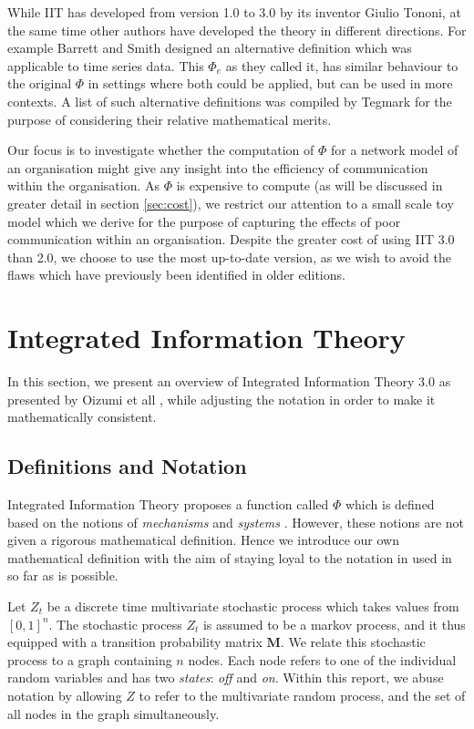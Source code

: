 While IIT has developed from version 1.0 to 3.0 by its inventor Giulio Tononi, at the same time other authors have developed the theory in different directions. For example Barrett and Smith \cite{barrett2011practical} designed an alternative definition which was applicable to time series data. This $\Phi_e$ as they called it, has similar behaviour to the original $\Phi$ in settings where both could be applied, but can be used in more contexts. A list of such alternative definitions was compiled by Tegmark \cite{tegmark2016improved} for the purpose of considering their relative mathematical merits.

Our focus is to investigate whether the computation of $\Phi$ for a network model of an organisation might give any insight into the efficiency of communication within the organisation. As $\Phi$ is expensive to compute (as will be discussed in greater detail in section \ref{sec:cost}), we restrict our attention to a small scale toy model which we derive for the purpose of capturing the effects of poor communication within an organisation. Despite the greater cost of using IIT 3.0 than 2.0, we choose to use the most up-to-date version, as we wish to avoid the flaws which have previously been identified in older editions.


\section{Integrated Information Theory}
\label{sec:iit}

In this section, we present an overview of Integrated Information Theory 3.0 as presented by Oizumi et all \cite{oizumi2014phenomenology}, while adjusting the notation in order to make it mathematically consistent.
	
\subsection{Definitions and Notation}

Integrated Information Theory proposes a function called $\Phi$ which is defined based on the notions of \textit{mechanisms} and \textit{systems} \cite{oizumi2014phenomenology}. However, these notions are not given a rigorous mathematical definition. Hence we introduce our own mathematical definition with the aim of staying loyal to the notation in used in \cite{krohn2016computing} so far as is possible.

Let $Z_t$ be a discrete time multivariate stochastic process which takes values from $[0,1]^n$.  The stochastic process $Z_t$ is assumed to be a markov process, and it thus equipped with a transition probability matrix $\mathbf{M}$. We relate this stochastic process to a graph containing $n$ nodes. Each node refers to one of the individual random variables and has two \textit{states}: \textit{off}  and \textit{on}. Within this report, we abuse notation by allowing $Z$ to refer to the multivariate random process, and the set of all nodes in the graph simultaneously. 

